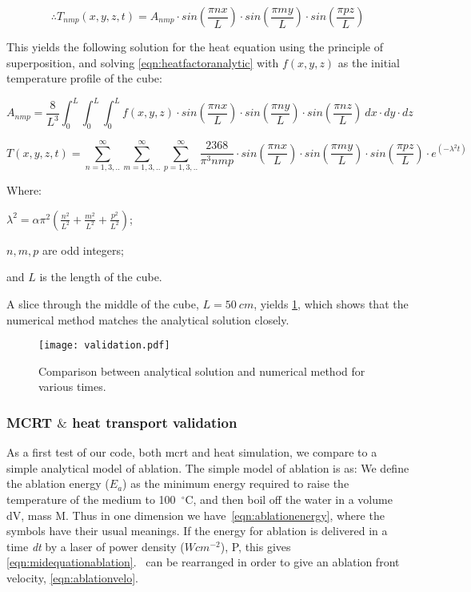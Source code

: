 \begin{equation}
\therefore  T_{nmp}(x,y,z,t)=A_{nmp}\cdot sin\left(\frac{\pi n x}{L}\right)\cdot sin\left(\frac{\pi m y}{L}\right)\cdot sin\left(\frac{\pi p z}{L}\right)
\end{equation}

This yields the following solution for the heat equation using the principle of superposition, and solving \cref{eqn:heatfactoranalytic} with $f(x,y,z)$ as the initial temperature profile of the cube:

\begin{equation}
A_{nmp}=\frac{8}{L^3}\int_0^L\int_0^L\int_0^L f(x,y,z)\cdot sin(\frac{\pi n x}{L})\cdot sin(\frac{\pi n y}{L})\cdot sin(\frac{\pi n z}{L})\ dx\cdot dy\cdot dz
\label{eqn:heatfactoranalytic}
\end{equation}

\begin{equation}
T(x,y,z,t)=\sum^\infty_{n=1,3,..}\sum^\infty_{m=1,3,..}\sum^\infty_{p=1,3,..}\frac{2368}{\pi^3nmp}\cdot sin(\frac{\pi n x}{L})\cdot sin(\frac{\pi m y}{L})\cdot sin(\frac{\pi p z}{L})\cdot e^{(-\lambda^2t)}
\end{equation}

\noindent Where:

	\indent $\lambda^2=\alpha\pi^2(\tfrac{n^2}{L^2}+\tfrac{m^2}{L^2}+\tfrac{p^2}{L^2})$;
	
	\indent $n,m,p$ are odd integers;
	
	\indent and $L$ is the length of the cube.
	
	\medskip
	
A slice through the middle of the cube, $L=50~cm$,  yields \cref{fig:validation-heat}, which shows that the numerical method matches the analytical solution closely.

\begin{figure}	
\vspace{-10pt}
	\centering
	\texttt{[image: validation.pdf]}
	\caption{Comparison between analytical solution and numerical method for various times.}
	\label{fig:validation-heat}
	\vspace{-10pt}
\end{figure}	

\subsubsection*{MCRT \texorpdfstring{$\&$}{and} heat transport validation}


As a first test of our code, both \gls{mcrt} and heat simulation, we compare to a simple analytical model of ablation. The simple model of ablation is as: We define the ablation energy ($E_a$) as the minimum energy required to raise the temperature of the medium to 100~$^{\circ}$C, and then boil off the water in a volume dV, mass M. Thus in one dimension we have~\cref{eqn:ablationenergy}, where the symbols have their usual meanings. If the energy for ablation is delivered in a time \textit{dt} by a laser of power density ($Wcm^{-2}$), P, this gives \cref{eqn:midequationablation}.~ can be rearranged in order to give an ablation front velocity, \cref{eqn:ablationvelo}.


